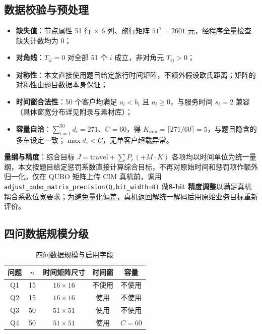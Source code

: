 \documentclass[UTF8,12pt,a4paper]{ctexart}
\begin{document}
\subsection{数据校验与预处理}

\begin{itemize}
    \item \textbf{缺失值}：节点属性 51 行 $\times$ 6 列、旅行矩阵 $51^{2}=2601$ 元，经程序全量检查缺失计数均为 0；
    \item \textbf{对角线}：$T_{ii}=0$ 对全部 51 个 $i$ 成立，非对角元 $T_{ij}>0$；
    \item \textbf{对称性}：本文直接使用题目给定旅行时间矩阵，不额外假设欧氏距离；矩阵的对称性由题目数据本身保证；
    \item \textbf{时间窗合法性}：50 个客户均满足 $a_i<b_i$ 且 $a_i\ge 0$，与服务时间 $s_i=2$ 兼容（具体窗宽分布详见附录与素材库）；
    \item \textbf{容量自洽}：$\sum_{i=1}^{50}d_i=271$、$C=60$，得 $K_{\min}=\lceil 271/60\rceil=5$，与题目隐含的多车设定一致；$\max d_i<C$，无单客户超载异常。
\end{itemize}

\noindent\textbf{量纲与精度}：综合目标 $J=\text{travel}+\sum P_i\,(+M\!\cdot\!K)$ 各项均以时间单位为统一量纲，本文按题目给定惩罚系数直接计算综合目标，不再对原始时间和惩罚项作额外归一化。仅在 QUBO 矩阵上传 CIM 真机前，调用 \texttt{adjust\_qubo\_matrix\_precision(Q,bit\_width=8)} 做\textbf{8-bit 精度调整}以满足真机耦合系数位宽要求；为避免量化偏差，真机返回解统一解码后用原始业务目标重新评价。

\subsection{四问数据规模分级}

\begin{table}[H]
    \centering
    \caption{四问数据规模与启用字段}
    \label{tab:scale}
    \begin{tabular}{c c c c c}
        \toprule
        问题 & $n$ & 时间矩阵尺寸 & 时间窗 & 容量 \\
        \midrule
        Q1 & 15 & $16\!\times\!16$ & 不使用 & 不使用 \\
        Q2 & 15 & $16\!\times\!16$ & 使用   & 不使用 \\
        Q3 & 50 & $51\!\times\!51$ & 使用   & 不使用 \\
        Q4 & 50 & $51\!\times\!51$ & 使用   & $C=60$ \\
        \bottomrule
    \end{tabular}
\end{table}
\end{document}
